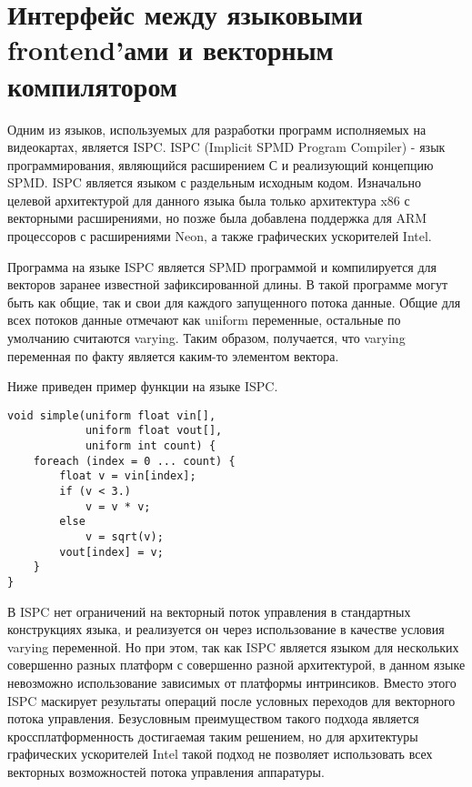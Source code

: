 \section{Интерфейс между языковыми frontend'ами и векторным компилятором}
\label{sec:Interface}

Одним из языков, используемых для разработки программ исполняемых на
видеокартах, является ISPC. ISPC (Implicit SPMD Program Compiler) - язык
программирования, являющийся расширением С и реализующий концепцию SPMD. ISPC
является языком с раздельным исходным кодом. Изначально целевой архитектурой для
данного языка была только архитектура x86 с векторными расширениями, но позже
была добавлена поддержка для ARM процессоров с расширениями Neon, а также
графических ускорителей Intel.

Программа на языке ISPC является SPMD программой и компилируется для векторов
заранее известной зафиксированной длины. В такой программе могут быть как общие,
так и свои для каждого запущенного потока данные. Общие для всех потоков данные
отмечают как uniform переменные, остальные по умолчанию считаются varying. Таким
образом, получается, что varying переменная по факту является каким-то элементом
вектора.

Ниже приведен пример функции на языке ISPC.

\begin{verbatim}
void simple(uniform float vin[],
            uniform float vout[],
            uniform int count) {
    foreach (index = 0 ... count) {
        float v = vin[index];
        if (v < 3.)
            v = v * v;
        else
            v = sqrt(v);
        vout[index] = v;
    }
}
\end{verbatim}

В ISPC нет ограничений на векторный поток управления в
стандартных конструкциях языка, и реализуется он через использование в качестве
условия varying переменной. Но при этом, так как ISPC является языком для
нескольких совершенно разных платформ с совершенно разной архитектурой, в данном
языке невозможно использование зависимых от платформы интринсиков. Вместо этого
ISPC маскирует результаты операций после условных переходов для векторного потока
управления. Безусловным преимуществом такого подхода является
кроссплатформенность достигаемая таким решением, но для архитектуры графических
ускорителей Intel такой подход не позволяет использовать всех векторных
возможностей потока управления аппаратуры.

